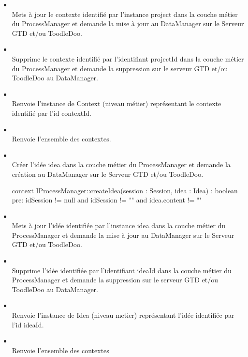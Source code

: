 \begin{itemize}
		\item {} \\
		Mets à jour le contexte identifié par l'instance project dans la couche métier
		du ProcessManager et demande la mise à jour au DataManager sur le Serveur GTD
		et/ou ToodleDoo.
		
		\item {} \\
		Supprime le contexte identifié par l'identifiant projectId dans la couche métier
		du ProcessManager et demande la suppression sur le serveur GTD et/ou ToodleDoo
		au DataManager.
		
		\item {} \\
		Renvoie l'instance de Context (niveau métier) représentant le contexte
		identifié par l'id contextId.
		
		\item {} \\
		Renvoie l'ensemble des contextes.
		
		\item {} \\
		Créer l'idée idea dans la couche métier du ProcessManager et demande
		la création au DataManager sur le Serveur GTD et/ou ToodleDoo.
\begin{ocl}
context IProcessManager::createIdea(session : Session, idea : Idea) : boolean
pre: 
	idSession != null and idSession != "" and
	idea.content != ""
\end{ocl}

		\item {} \\
		Mets à jour l'idée identifiée par l'instance idea dans la couche
		métier du ProcessManager et demande la mise à jour au DataManager sur le Serveur GTD
		et/ou ToodleDoo.
		
		\item {} \\
		Supprime l'idée identifiée par l'identifiant ideaId dans la couche métier
		du ProcessManager et demande la suppression sur le serveur GTD et/ou ToodleDoo
		au DataManager.
		
		\item {} \\
		Renvoie l'instance de Idea (niveau metier) représentant l'idée
		identifiée par l'id ideaId.
		
		\item {} \\
		Renvoie l'ensemble des contextes
	
	\end{itemize}
	
